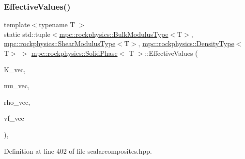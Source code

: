 \subsubsection{\texorpdfstring{Effective\+Values()}{EffectiveValues()}}
{\footnotesize\ttfamily template$<$typename T $>$ \\
static std\+::tuple$<$\mbox{\hyperlink{structmpc_1_1rockphysics_1_1_bulk_modulus_type}{mpc\+::rockphysics\+::\+Bulk\+Modulus\+Type}}$<$T$>$, \mbox{\hyperlink{structmpc_1_1rockphysics_1_1_shear_modulus_type}{mpc\+::rockphysics\+::\+Shear\+Modulus\+Type}}$<$T$>$, \mbox{\hyperlink{structmpc_1_1rockphysics_1_1_density_type}{mpc\+::rockphysics\+::\+Density\+Type}}$<$T$>$ $>$ \mbox{\hyperlink{classmpc_1_1rockphysics_1_1_solid_phase}{mpc\+::rockphysics\+::\+Solid\+Phase}}$<$ T $>$\+::Effective\+Values (\begin{DoxyParamCaption}\item[{const std\+::vector$<$ \mbox{\hyperlink{structmpc_1_1rockphysics_1_1_bulk_modulus_type}{mpc\+::rockphysics\+::\+Bulk\+Modulus\+Type}}$<$ T $>$ $>$ \&}]{K\+\_\+vec,  }\item[{const std\+::vector$<$ \mbox{\hyperlink{structmpc_1_1rockphysics_1_1_shear_modulus_type}{mpc\+::rockphysics\+::\+Shear\+Modulus\+Type}}$<$ T $>$ $>$ \&}]{mu\+\_\+vec,  }\item[{const std\+::vector$<$ \mbox{\hyperlink{structmpc_1_1rockphysics_1_1_density_type}{mpc\+::rockphysics\+::\+Density\+Type}}$<$ T $>$ $>$ \&}]{rho\+\_\+vec,  }\item[{const std\+::vector$<$ \mbox{\hyperlink{structmpc_1_1rockphysics_1_1_volume_fraction_type}{mpc\+::rockphysics\+::\+Volume\+Fraction\+Type}}$<$ T $>$ $>$ \&}]{vf\+\_\+vec }\end{DoxyParamCaption})\hspace{0.3cm}{\ttfamily [inline]}, {\ttfamily [static]}}



Definition at line 402 of file scalarcomposites.\+hpp.

\mbox{\label{classmpc_1_1rockphysics_1_1_solid_phase_a3affb77f60c2967aa08833e703e0b932}} 
